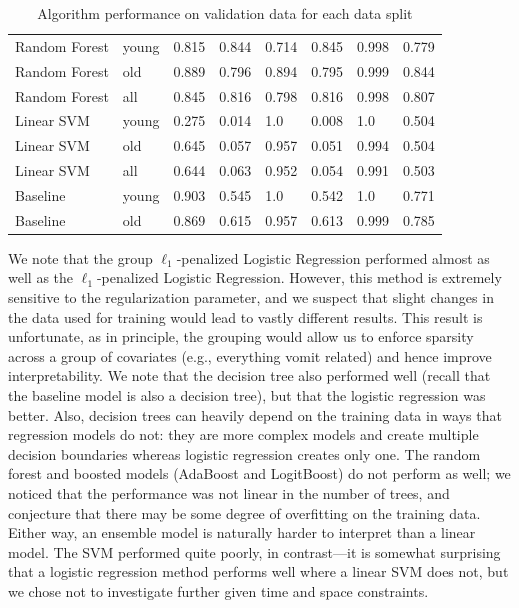 \documentclass[11pt, letterpaper]{amsart}
\begin{document}
\begin{table}[h]
{\begin{tabular}{llllllll}
Random Forest  & young & 0.815 & 0.844    & 0.714       & 0.845       & 0.998 & 0.779             \\
Random Forest  & old   & 0.889 & 0.796    & 0.894       & 0.795       & 0.999 & 0.844             \\
Random Forest  & all   & 0.845 & 0.816    & 0.798       & 0.816       & 0.998 & 0.807             \\
Linear SVM            & young & 0.275 & 0.014    & 1.0         & 0.008       & 1.0   & 0.504             \\
Linear SVM            & old   & 0.645 & 0.057    & 0.957       & 0.051       & 0.994 & 0.504             \\
Linear SVM            & all   & 0.644 & 0.063    & 0.952       & 0.054       & 0.991 & 0.503             \\
Baseline       & young & 0.903 & 0.545     & 1.0         & 0.542       & 1.0   & 0.771             \\
Baseline       & old   & 0.869 & 0.615    & 0.957       & 0.613       & 0.999 & 0.785           
\end{tabular} }
\caption{Algorithm performance on validation data for each data split}\label{tab:val_performance}
\end{table}

We note that the group $\ell_1$-penalized Logistic Regression performed almost as well as the $\ell_1$-penalized Logistic Regression. However, this method is extremely sensitive to the regularization parameter, and we suspect that slight changes in the data used for training would lead to vastly different results. This result is unfortunate, as in principle, the grouping would allow us to enforce sparsity across a group of covariates (e.g., everything vomit related) and hence improve interpretability. We note that the decision tree also performed well (recall that the baseline model is also a decision tree), but that the logistic regression was better. Also, decision trees can heavily depend on the training data in ways that regression models do not: they are more complex models and create multiple decision boundaries whereas logistic regression creates only one. The random forest and boosted models (AdaBoost and LogitBoost) do not perform as well; we noticed that the performance was not linear in the number of trees, and conjecture that there may be some degree of overfitting on the training data. Either way, an ensemble model is naturally harder to interpret than a linear model. The SVM performed quite poorly, in contrast---it is somewhat surprising that a logistic regression method performs well where a linear SVM does not, but we chose not to investigate further given time and space constraints. 
\end{document}
